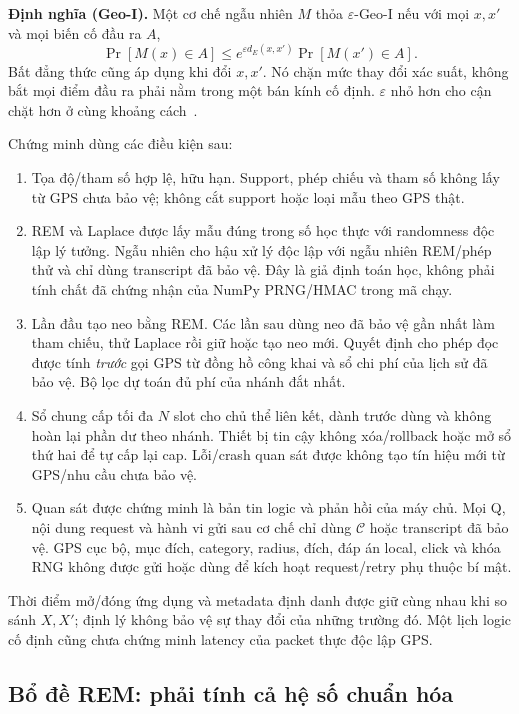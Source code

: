 \noindent\textbf{Định nghĩa (Geo-I).} Một cơ chế ngẫu nhiên $M$ thỏa $\varepsilon$-Geo-I nếu với mọi $x,x'$ và mọi biến cố đầu ra $A$,
\begin{equation}
 \Pr[M(x)\in A]\leq e^{\varepsilon d_E(x,x')}\Pr[M(x')\in A].
 \label{eq:formal-geoi-definition}
\end{equation}
Bất đẳng thức cũng áp dụng khi đổi $x,x'$. Nó chặn mức thay đổi xác suất, không bắt mọi điểm đầu ra phải nằm trong một bán kính cố định. $\varepsilon$ nhỏ hơn cho cận chặt hơn ở cùng khoảng cách~\cite{andres2013geoi}.

Chứng minh dùng các điều kiện sau:
\begin{enumerate}
 \item Tọa độ/tham số hợp lệ, hữu hạn. Support, phép chiếu và tham số không
 lấy từ GPS chưa bảo vệ; không cắt support hoặc loại mẫu theo GPS thật.
 \item REM và Laplace được lấy mẫu đúng trong số học thực với randomness
 độc lập lý tưởng. Ngẫu nhiên cho hậu xử lý độc lập với ngẫu nhiên REM/phép thử và chỉ dùng
 transcript đã bảo vệ. Đây là giả định toán học, không phải tính chất đã
 chứng nhận của NumPy PRNG/HMAC trong mã chạy.
 \item Lần đầu tạo neo bằng REM. Các lần sau dùng neo đã bảo vệ gần nhất
 làm tham chiếu, thử Laplace rồi giữ hoặc tạo neo mới. Quyết định cho phép
 đọc được tính \emph{trước} gọi GPS từ đồng hồ công khai và sổ chi phí của
 lịch sử đã bảo vệ. Bộ lọc dự toán đủ phí của nhánh đắt nhất.
 \item Sổ chung cấp tối đa $N$ slot cho chủ thể liên kết, dành trước dùng và
 không hoàn lại phần dư theo nhánh. Thiết bị tin cậy không xóa/rollback hoặc
 mở sổ thứ hai để tự cấp lại cap. Lỗi/crash quan sát được không tạo tín hiệu
 mới từ GPS/nhu cầu chưa bảo vệ.
 \item Quan sát được chứng minh là bản tin logic và phản hồi của máy chủ.
 Mọi Q, nội dung request và hành vi gửi sau cơ chế chỉ dùng $\mathcal C$
 hoặc transcript đã bảo vệ. GPS cục bộ, mục đích, category, radius, đích,
 đáp án local, click và khóa RNG không được gửi hoặc dùng để kích hoạt
 request/retry phụ thuộc bí mật.
\end{enumerate}

Thời điểm mở/đóng ứng dụng và metadata định danh được giữ cùng nhau khi so
sánh $X,X'$; định lý không bảo vệ sự thay đổi của những trường đó. Một lịch
logic cố định cũng chưa chứng minh latency của packet thực độc lập GPS.

\subsection{Bổ đề REM: phải tính cả hệ số chuẩn hóa}
\label{sec:formal-rem}

